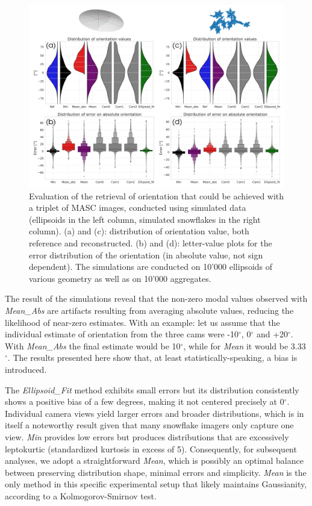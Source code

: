 \documentclass[draft]{agujournal2019}
\begin{document}
\begin{figure}
 \noindent \centering \includegraphics[width=\textwidth]{Fig02.png}
\caption{Evaluation of the retrieval of orientation that could be achieved with a triplet of MASC images, conducted using simulated data (ellipsoids in the left column, simulated snowflakes in the right column). (a) and (c): distribution of orientation value, both reference and reconstructed. (b) and (d): letter-value plots for the  error distribution of the orientation (in absolute value, not sign dependent). The simulations are conducted on 10'000 ellipsoids of various geometry as well as on 10'000 aggregates. }
\label{fig:simulations}
\end{figure}

The result of the simulations reveal that the non-zero modal values observed with \textit{Mean\_Abs} are artifacts resulting from averaging absolute values, reducing the likelihood of near-zero estimates. With an example: let us assume that the individual estimate of orientation from the three cams were -10$^\circ$, 0$^\circ$ and +20$^\circ$. With \textit{Mean\_Abs} the final estimate would be 10$^\circ$, while for \textit{Mean} it would be 3.33$^\circ$. The results presented here show that, at least statistically-speaking, a bias is introduced. 

The \textit{Ellipsoid\_Fit} method exhibits small errors but its distribution consistently shows a positive bias of a few degrees, making it not centered precisely at 0$^\circ$. Individual camera views yield larger errors and broader distributions, which is in itself a noteworthy result given that many snowflake imagers only capture one view. \textit{Min} provides low errors but produces distributions that are excessively leptokurtic (standardized kurtosis in excess of 5). Consequently, for subsequent analyses, we adopt a straightforward \textit{Mean}, which is possibly an optimal balance between preserving distribution shape, minimal errors and simplicity. \textit{Mean} is the only method in this specific experimental setup that likely maintains Gaussianity,  according to a Kolmogorov-Smirnov test.
\end{document}
